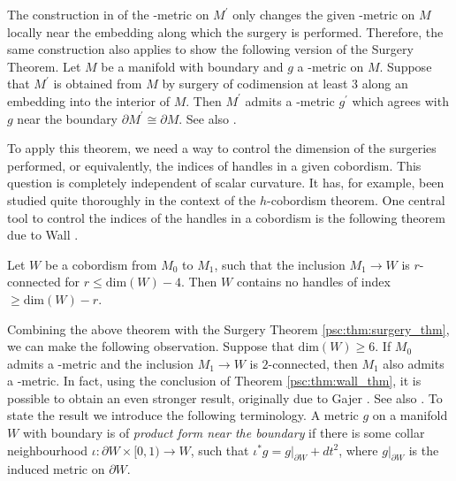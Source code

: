 \begin{remark}
    \label{psc:rem:surgery_thm_locality}
    The construction in \cite{gromov_lawson_surgerytheorem} of the \psc-metric on $M^\prime$ only changes the given \psc-metric on $M$ locally near the embedding along which the surgery is performed. Therefore, the same construction also applies to show the following version of the Surgery Theorem. Let $M$ be a manifold with boundary and $g$ a \psc-metric on $M$. Suppose that $M^\prime$ is obtained from $M$ by surgery of codimension at least $3$ along an embedding into the interior of $M$. Then $M^\prime$ admits a \psc-metric $g^\prime$ which agrees with $g$ near the boundary $\partial M^\prime \cong \partial M$. See also \cite[Thm. 1.6]{FrenckEbertChernysh}.
\end{remark}

To apply this theorem, we need a way to control the dimension of the surgeries performed, or equivalently, the indices of handles in a given cobordism. This question is completely independent of scalar curvature. It has, for example, been studied quite thoroughly in the context of the $h$-cobordism theorem. One central tool to control the indices of the handles in a cobordism is the following theorem due to Wall \cite[Thm. 3]{Wall1971GeometricalConnectivity}.

\begin{theorem}[Wall, 1971]
    \label{psc:thm:wall_thm}
    Let $W$ be a cobordism from $M_0$ to $M_1$, such that the inclusion $M_1 \to W$ is $r$-connected for $r \leq \mathrm{dim}(W) - 4$. Then $W$ contains no handles of index $\geq \mathrm{dim}(W) - r$.
\end{theorem}

Combining the above theorem with the Surgery Theorem \ref{psc:thm:surgery_thm}, we can make the following observation. Suppose that $\mathrm{dim}(W) \geq 6$. If $M_0$ admits a \psc-metric and the inclusion $M_1 \to W$ is $2$-connected, then $M_1$ also admits a \psc-metric. In fact, using the conclusion of Theorem \ref{psc:thm:wall_thm}, it is possible to obtain an even stronger result, originally due to Gajer \cite{gajer1987riemannian}. See also \cite[Prop. B.1]{Frenck2026Doubling}. To state the result we introduce the following terminology. A metric $g$ on a manifold $W$ with boundary is of \textit{product form near the boundary} if there is some collar neighbourhood $\iota \colon \partial W \times [0,1) \to W$, such that \linebreak$\iota^\ast g = g|_{\partial W} + dt^2$, where $g|_{\partial W}$ is the induced metric on $\partial W$.


